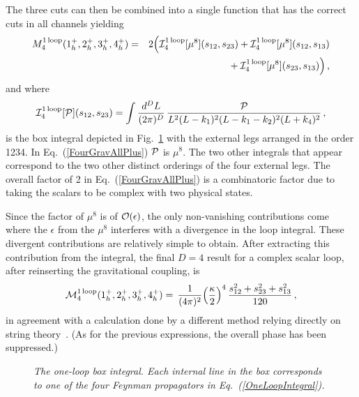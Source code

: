 The three cuts can then be combined into a single function that has the correct
cuts in all channels yielding 
\begin{eqnarray}
M_4^{\rm 1 \,loop}(1^+_h, 2^+_h, 3^+_h, 4^+_h)  & = &
 2 \Bigl({\cal I}_4^{\rm 1\, loop}[\mu^8](s_{12},s_{23}) + 
       {\cal I}_4^{\rm 1\, loop}[\mu^8](s_{12},s_{13}) \nonumber \\
& &
\null   + {\cal I}_4^{\rm 1\, loop}[\mu^8](s_{23},s_{13}) \Bigr)\,, 
\label{FourGravAllPlus}
\end{eqnarray}
%
and where
%
\begin{equation}
{\cal I}_4^{\rm 1\, loop}[{\cal P}](s_{12},s_{23}) = 
\int {d^D L \over (2\pi)^D}
\, {{\cal P} \over L^2 (L - k_1)^2
       (L - k_1 - k_2)^2
        (L + k_4)^2  } \,,
\label{OneLoopIntegral} 
\end{equation}
%
is the box integral depicted in
Fig.~\ref{figure:OneloopIntegral} with the external legs arranged in
the order 1234. In Eq.~(\ref{FourGravAllPlus}) ${\cal P}$ is $\mu^8$.
The two other integrals that appear correspond to the two other
distinct orderings of the four external legs.  The overall factor of 2
in Eq.~(\ref{FourGravAllPlus}) is a combinatoric factor due to taking
the scalars to be complex with two physical states.

Since the factor of $\mu^8$ is of ${\cal O}(\epsilon)$, the only non-vanishing
contributions come where the $\epsilon$ from the $\mu^8$ interferes with 
a divergence in the loop integral.  These divergent contributions
are relatively simple  to obtain.  After extracting this contribution from
the integral, the final $D=4$ result for a complex scalar loop, after
reinserting the gravitational coupling, is
%
\begin{equation}
{\cal M}_4^{\rm 1\, loop} (1^+_h, 2^+_h, 3^+_h, 4^+_h) 
   =  \, {1 \over (4 \pi)^2} \Bigl({\kappa\over 2} \Bigr)^4\, 
     {s_{12}^2 + s_{23}^2 + s_{13}^2 \over 120} \,, 
\label{FourGravPlus}
\end{equation}
%
in agreement with a calculation done by a different
method relying directly on string theory~\cite{DunbarNorridge95}. 
(As for the previous expressions, the overall phase has been suppressed.)

\begin{figure}[h]
  \def\epsfsize#1#2{0.5#1}
  \centerline{}
  \caption{\it The one-loop box integral. Each internal 
  line in the box corresponds to one of the four Feynman propagators in 
   Eq.~(\ref{OneLoopIntegral}).}
  \label{figure:OneloopIntegral}
\end{figure}


